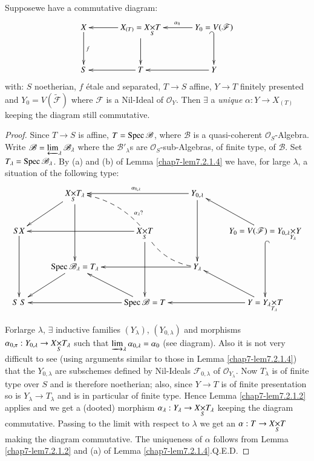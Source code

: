 \begin{sublemma}\label{chap7-lem7.2.1.5}
Suppose\pageoriginale we have a commutative diagram:
\[
\xymatrix@=1.2cm{
X\ar[d]^{f} & X_{(T)}=\fprod{X}{T}{S}\ar[l]\ar[d] &
Y_{0}=V(\mathscr{F})\ar@{_{(}->}[d]\ar[l]_{\alpha_{0}}\\
S & T\ar[l] & Y\ar[l]
}
\]
with: $S$ noetherian, $f$ \'etale and separated, $T\to S$ affine,
$Y\to T$ finitely presented and $Y_{0}=V(\widetilde{\mathscr{F}})$ where
$\mathscr{F}$ is a Nil-Ideal of $\mathscr{O}_{Y}$. Then $\exists$ a
{\em unique} $\alpha:Y\to X_{(T)}$ keeping the diagram still
commutative. 
\end{sublemma}

\begin{proof}
Since $T\to S$ is affine, $T=\operatorname{Spec} \mathscr{B}$, where $\mathscr{B}$
is a quasi-coherent $\mathscr{O}_{S}$-Algebra. Write
$\mathscr{B}=\varprojlim_{\lambda}\mathscr{B}_{\lambda}$ where the
$\mathscr{B}'_{\lambda}$s are $\mathscr{O}_{S}$-sub-Algebras, of
finite type, of $\mathscr{B}$. Set $T_{\lambda}=\operatorname{Spec}
\mathscr{B}_{\lambda}$. By (a) and (b) of Lemma \ref{chap7-lem7.2.1.4} we
have, for large $\lambda$, a situation of the following type:
{\fontsize{8}{10}\selectfont
\[
\xymatrix{
 & \fprod{X}{T_{\lambda}}{S}\ar[dl]\ar@{<--}@/^1em/[dr]^>>>>{\alpha_{\lambda}?}\ar[dd] & & \ar[ll]_{\alpha_{0,\lambda}}Y_{0,\lambda}\ar[dd]\\
SX\ar[dd] & & \fprod{X}{T}{S}\ar[ll]\ar[dd]\ar@{--}@/_1em/[dr] & & Y_{0}=V(\mathscr{F})=\fprod{Y_{0,\lambda}}{Y}{Y_{\lambda}}\ar[ul]\ar@{^{(}->}[dd]\\
 & \Spec \mathscr{B}_{\lambda}=T_{\lambda}\ar[dl] & &
Y_{\lambda}\ar[ll] &\\
S\ S & & \Spec\mathscr{B}=T\ar[ll]\ar[ul] & & Y=\fprod{Y_{\lambda}}{T}{T_{\lambda}}\ar[ll]\ar[ul]
}
\]}\relax

For\pageoriginale large $\lambda$, $\exists$ inductive families
$(Y_{\lambda})$, $(Y_{0,\lambda})$ and morphisms
$\alpha_{0,\pi}:Y_{0,\lambda}\to \fprod{X}{T_{\lambda}}{S}$ such that
$\varinjlim_{\lambda}\alpha_{0,\lambda}=\alpha_{0}$ (see
diagram). Also it is not very difficult to see (using arguments
similar to those in Lemma \ref{chap7-lem7.2.1.4}) that the $Y_{0,\lambda}$
are subschemes defined by Nil-Ideals $\mathscr{F}_{0,\lambda}$ of
$\mathscr{O}_{Y_{\lambda}}$. Now $T_{\lambda}$ is of finite type over
$S$ and is therefore noetherian; also, since $Y\to T$ is of finite
presentation so is $Y_{\lambda}\to T_{\lambda}$ and is in particular
of finite type. Hence Lemma \ref{chap7-lem7.2.1.2} applies and we get a
(dooted) morphism $\alpha_{\lambda}:Y_{\lambda}\to
\fprod{X}{T_{\lambda}}{S}$ keeping the diagram commutative. Passing to
the limit with respect to $\lambda$ we get an $\alpha:T\to
\fprod{X}{T}{S}$ making the diagram commutative. The uniqueness of
$\alpha$ follows from Lemma \ref{chap7-lem7.2.1.2} and (a) of Lemma
\ref{chap7-lem7.2.1.4}.\hfill Q.E.D.
\end{proof}


